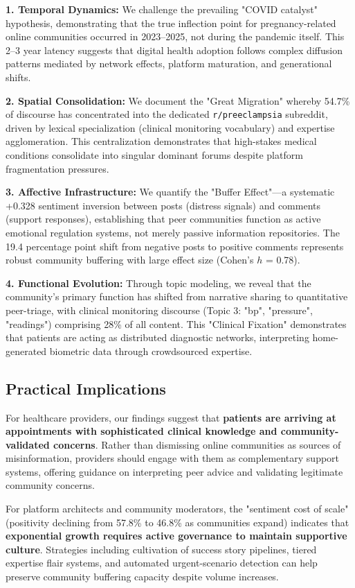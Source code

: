 \documentclass[12pt, a4paper]{article}
\begin{document}
\textbf{1. Temporal Dynamics:} We challenge the prevailing "COVID catalyst" hypothesis, demonstrating that the true inflection point for pregnancy-related online communities occurred in 2023--2025, not during the pandemic itself. This 2--3 year latency suggests that digital health adoption follows complex diffusion patterns mediated by network effects, platform maturation, and generational shifts.

\textbf{2. Spatial Consolidation:} We document the "Great Migration" whereby 54.7\% of discourse has concentrated into the dedicated \texttt{r/preeclampsia} subreddit, driven by lexical specialization (clinical monitoring vocabulary) and expertise agglomeration. This centralization demonstrates that high-stakes medical conditions consolidate into singular dominant forums despite platform fragmentation pressures.

\textbf{3. Affective Infrastructure:} We quantify the "Buffer Effect"—a systematic +0.328 sentiment inversion between posts (distress signals) and comments (support responses), establishing that peer communities function as active emotional regulation systems, not merely passive information repositories. The 19.4 percentage point shift from negative posts to positive comments represents robust community buffering with large effect size (Cohen's $h$ = 0.78).

\textbf{4. Functional Evolution:} Through topic modeling, we reveal that the community's primary function has shifted from narrative sharing to quantitative peer-triage, with clinical monitoring discourse (Topic 3: "bp", "pressure", "readings") comprising 28\% of all content. This "Clinical Fixation" demonstrates that patients are acting as distributed diagnostic networks, interpreting home-generated biometric data through crowdsourced expertise.

\subsection{Practical Implications}
For healthcare providers, our findings suggest that \textbf{patients are arriving at appointments with sophisticated clinical knowledge and community-validated concerns}. Rather than dismissing online communities as sources of misinformation, providers should engage with them as complementary support systems, offering guidance on interpreting peer advice and validating legitimate community concerns.

For platform architects and community moderators, the "sentiment cost of scale" (positivity declining from 57.8\% to 46.8\% as communities expand) indicates that \textbf{exponential growth requires active governance to maintain supportive culture}. Strategies including cultivation of success story pipelines, tiered expertise flair systems, and automated urgent-scenario detection can help preserve community buffering capacity despite volume increases.
\end{document}
